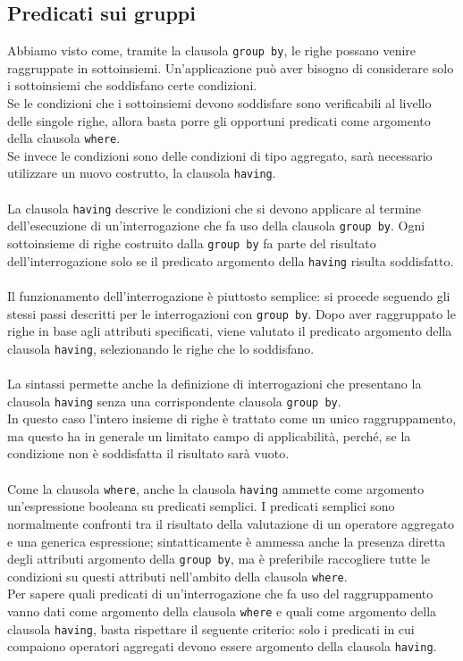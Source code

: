 \subsection{Predicati sui gruppi}
Abbiamo visto come, tramite la clausola \texttt{group by}, le righe possano venire raggruppate in sottoinsiemi. Un'applicazione può aver bisogno di considerare solo i sottoinsiemi che soddisfano certe condizioni.\\
Se le condizioni che i sottoinsiemi devono soddisfare sono verificabili al livello delle singole righe, allora basta porre gli opportuni predicati come argomento della clausola \texttt{where}.\\
Se invece le condizioni sono delle condizioni di tipo aggregato, sarà necessario utilizzare un nuovo costrutto, la clausola \texttt{having}.\\\\
La clausola \texttt{having} descrive le condizioni che si devono applicare al termine dell'esecuzione di un'interrogazione che fa uso della clausola \texttt{group by}. Ogni sottoinsieme di righe costruito dalla \texttt{group by} fa parte del risultato dell'interrogazione solo se il predicato argomento della \texttt{having} risulta soddisfatto.\\\\
Il funzionamento dell'interrogazione è piuttosto semplice: si procede seguendo gli stessi passi descritti per le interrogazioni con \texttt{group by}. Dopo aver raggruppato le righe in base agli attributi specificati, viene valutato il predicato argomento della clausola \texttt{having}, selezionando le righe che lo soddisfano.\\\\
La sintassi permette anche la definizione di interrogazioni che presentano la clausola \texttt{having} senza una corrispondente clausola \texttt{group by}.\\
In questo caso l'intero insieme di righe è trattato come un unico raggruppamento, ma questo ha in generale un limitato campo di applicabilità, perché, se la condizione non è soddisfatta il risultato sarà vuoto.\\\\
Come la clausola \texttt{where}, anche la clausola \texttt{having} ammette come argomento un'espressione booleana su predicati semplici. I predicati semplici sono normalmente confronti tra il risultato della valutazione di un operatore aggregato e una generica espressione; sintatticamente è ammessa anche la presenza diretta degli attributi argomento della \texttt{group by}, ma è preferibile raccogliere tutte le condizioni su questi attributi nell'ambito della clausola \texttt{where}.\\
Per sapere quali predicati di un'interrogazione che fa uso del raggruppamento vanno dati come argomento della clausola \texttt{where} e quali come argomento della clausola \texttt{having}, basta rispettare il seguente criterio: solo i predicati in cui compaiono operatori aggregati devono essere argomento della clausola \texttt{having}.

